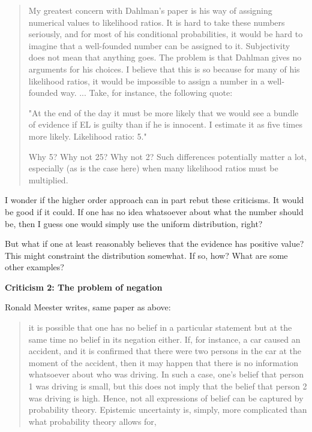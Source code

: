 \documentclass[
  10pt,
  dvipsnames,enabledeprecatedfontcommands]{scrartcl}
\begin{document}
\begin{quote}

My greatest concern with Dahlman's paper is his way of assigning numerical values to likelihood ratios. It is hard to take these numbers seriously, and for most of his conditional probabilities, it would be hard to imagine that a well-founded number can be assigned to it. Subjectivity does not mean that anything goes. The problem is that Dahlman gives no arguments for his choices. I believe that this is so because for many of his likelihood ratios, it would be impossible to assign a number in a well-founded way. ... Take, for instance, the following quote:

"At the end of the day it must be more likely that we would see a bundle of evidence if EL is guilty than if he is innocent. I estimate it as five times more likely. Likelihood ratio: 5."

Why 5? Why not 25? Why not 2? Such differences potentially matter a lot, especially (as is the case here) when many likelihood ratios must be multiplied.
\end{quote}

I wonder if the higher order approach can in part rebut these
criticisms. It would be good if it could. If one has no idea whatsoever
about what the number should be, then I guess one would simply use the
uniform distribution, right?

But what if one at least reasonably believes that the evidence has
positive value? This might constraint the distribution somewhat. If so,
how? What are some other examples?

\textbf{Criticism 2: The problem of negation}

Ronald Meester writes, same paper as above:

\begin{quote}
it is possible that one has no belief in a particular statement but at the same time no belief in its negation either. If, for instance, a car caused an accident, and it is confirmed that there were two persons in the car at the moment of the accident, then it may happen that there is no information whatsoever about who was driving. In such a case, one's belief that person 1 was driving is small, but this does not imply that the belief that person 2 was driving is high. Hence, not all expressions of belief can be captured by probability theory. Epistemic uncertainty is, simply, more complicated than what probability theory allows for,
\end{quote}
\end{document}
